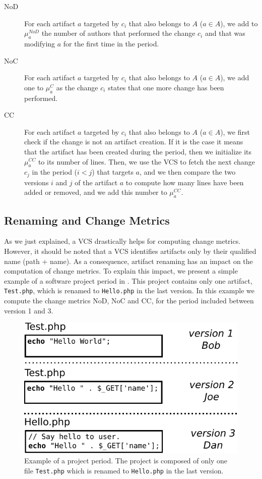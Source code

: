 \begin{description}
	\item[NoD] For each artifact $a$ targeted by $c_i$ that also belongs to $A$ ($a \in A$), we add to $\mu_{a}^{NoD}$ the number of authors that performed the change $c_i$ and that was modifying $a$ for the first time in the period.
	\item[NoC] For each artifact $a$ targeted by $c_i$ that also belongs to $A$ ($a \in A$), we add one to $\mu_{a}^{C}$ as the change $c_i$ states that one more change has been performed.
	\item[CC] For each artifact $a$ targeted by $c_i$ that also belongs to $A$ ($a \in A$), we first check if the change is not an artifact creation. If it is the case it means that the artifact has been created during the period, then we initialize its $\mu_{a}^{CC}$ to its number of lines. Then, we use the VCS to fetch the next change $c_j$ in the period ($i < j$) that targets $a$, and we then compare the two versions $i$ and $j$ of the artifact $a$ to compute how many lines have been added or removed, and we add this number to $\mu_{a}^{CC}$.
\end{description}

\subsection{Renaming and Change Metrics}

As we just explained, a VCS drastically helps for computing change metrics. However, it should be noted that a VCS identifies artifacts only by their qualified name (path + name). As a consequence, artifact renaming has an impact on the computation of change metrics. To explain this impact, we present a simple example of a software project period in . This project contains only one artifact, \texttt{Test.php}, which is renamed to \texttt{Hello.php} in the last version. In this example we compute the change metrics NoD, NoC and CC, for the period included between version 1 and 3.

\begin{figure}[t]
	\centering
	\includegraphics[width=0.8\linewidth,keepaspectratio]{data/figures/example.pdf}
	\caption{Example of a project period. The project is composed of only one file \texttt{Test.php} which is renamed to \texttt{Hello.php} in the last version.}
	\label{fig:example}
\end{figure}

